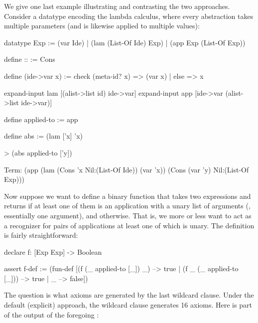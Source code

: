 We give one last example illustrating and contrasting the two approaches. 
Consider a datatype encoding the lambda calculus, where every abstraction
takes multiple parameters (and is likewise applied to 
multiple values): 
\begin{tcAthena}
datatype Exp := (var Ide) | (lam (List-Of Ide) Exp) | (app Exp (List-Of Exp))

define :: := Cons

define (ide->var x) := 
  check { (meta-id? x) => (var x) 
        | else => x }

expand-input lam [(alist->list id) ide->var]
expand-input app [ide->var (alist->list ide->var)]

define applied-to := app 

define abs := (lam ['x] 'x)

> (abs applied-to ['y])

Term: (app (lam (Cons 'x
                      Nil:(List-Of Ide))
                (var 'x))
           (Cons (var 'y)
                 Nil:(List-Of Exp)))
\end{tcAthena}
Now suppose we want to define a binary function  that takes two 
expressions and returns  if at least one of them is an 
application with a unary list of arguments
(\iensp, essentially one argument), and  otherwise. 
That is, we more or less want  to act as a recognizer for pairs of
applications at least one of which is unary. 
The definition is fairly straightforward:
\begin{tcAthena}
declare f: [Exp Exp] -> Boolean

assert f-def :=
  (fun-def [(f (_ applied-to [_]) _) --> true
          | (f _ (_ applied-to [_])) --> true
          | _ --> false])
\end{tcAthena}
The question is what axioms are generated by the last
wildcard clause. Under the default (explicit) approach, 
the wildcard clause generates 16 axioms. Here is part
of the output of the foregoing :
